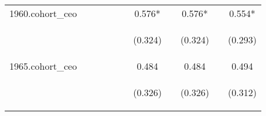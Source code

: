 \begin{center}
\begin{tabular}{lcccccccccc}
1960.cohort\_ceo &  &  &  &  &  & 0.576* &  & 0.576* &  & 0.554* \\
\vspace{4pt} & \begin{footnotesize}\end{footnotesize} & \begin{footnotesize}\end{footnotesize} & \begin{footnotesize}\end{footnotesize} & \begin{footnotesize}\end{footnotesize} & \begin{footnotesize}\end{footnotesize} & \begin{footnotesize}(0.324)\end{footnotesize} & \begin{footnotesize}\end{footnotesize} & \begin{footnotesize}(0.324)\end{footnotesize} & \begin{footnotesize}\end{footnotesize} & \begin{footnotesize}(0.293)\end{footnotesize} \\
1965.cohort\_ceo &  &  &  &  &  & 0.484 &  & 0.484 &  & 0.494 \\
\vspace{4pt} & \begin{footnotesize}\end{footnotesize} & \begin{footnotesize}\end{footnotesize} & \begin{footnotesize}\end{footnotesize} & \begin{footnotesize}\end{footnotesize} & \begin{footnotesize}\end{footnotesize} & \begin{footnotesize}(0.326)\end{footnotesize} & \begin{footnotesize}\end{footnotesize} & \begin{footnotesize}(0.326)\end{footnotesize} & \begin{footnotesize}\end{footnotesize} & \begin{footnotesize}(0.312)\end{footnotesize} \\

\end{tabular}
\end{center}
